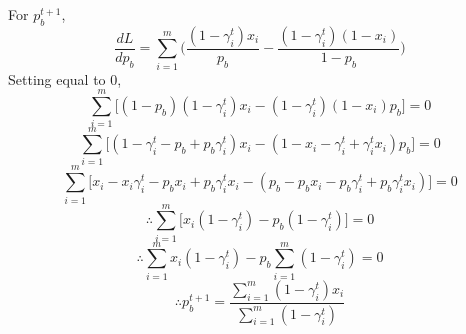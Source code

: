 \documentclass[english]{article}
\begin{document}
\begin{enumerate}
    For ${p_b^{t+1}}$,
    $$\frac{dL}{dp_b} =  \sum_{i = 1}^{m} \bigg( \frac{(1-\gamma_i^t)x_i}{p_b} - \frac{(1-\gamma_i^t)(1-x_i)}{1-p_b} \bigg)$$
    Setting equal to $0$,
    $$\sum_{i = 1}^{m} \big[(1-p_b)(1-\gamma_i^t)x_i - (1-\gamma_i^t)(1-x_i)p_b \big] = 0$$
    $$\sum_{i = 1}^{m} \big[(1 - \gamma_i^t - p_b + p_b\gamma_i^t)x_i - (1 - x_i - \gamma_i^t + \gamma_i^tx_i)p_b  \big] = 0$$
    $$\sum_{i = 1}^{m} \big[x_i - x_i\gamma_i^t - p_bx_i + p_b\gamma_i^tx_i - (p_b - p_bx_i - p_b\gamma_i^t + p_b\gamma_i^tx_i) \big] = 0$$
    $$\therefore \sum_{i = 1}^{m} \big[x_i(1-\gamma_i^t) - p_b(1-\gamma_i^t)\big] = 0$$
    $$\therefore \sum_{i = 1}^{m} x_i(1-\gamma_i^t) - p_b \sum_{i = 1}^{m}(1-\gamma_i^t) = 0$$
    $$\therefore \boxed{p_b^{t+1} = \frac{\sum_{i = 1}^{m} (1-\gamma_i^t)x_i}{\sum_{i = 1}^{m} (1-\gamma_i^t)}}$$
    
\end{enumerate}
\newpage
\end{document}

